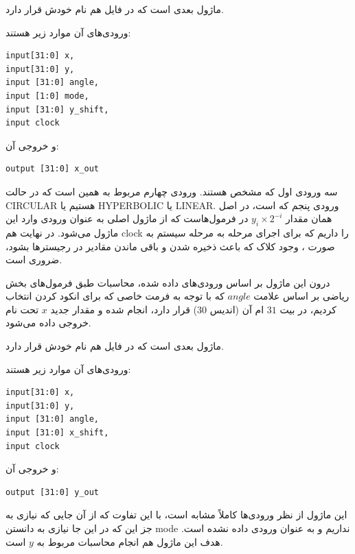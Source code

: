 \documentclass[12pt,titlepage,a4page , tikz , multi,table , svgnames,xcdraw]{article}
\begin{document}
\hrulefill

ماژول بعدی  است که در فایل هم نام خودش قرار دارد.

 
 ورودی‌های آن موارد زیر هستند:

\begin{latin}
\begin{verbatim}
input[31:0] x,
input[31:0] y,
input [31:0] angle,
input [1:0] mode,
input [31:0] y_shift,
input clock
\end{verbatim}
\end{latin}

و خروجی آن:

\begin{latin}
\begin{verbatim}
output [31:0] x_out
\end{verbatim}
\end{latin}

سه ورودی اول که مشخص هستند. ورودی چهارم مربوط به همین است که در حالت CIRCULAR هستیم یا HYPERBOLIC یا LINEAR. ورودی پنجم که  است، در اصل همان مقدار $y_i \times 2^{-i}$ در فرمول‌هاست که از ماژول اصلی به عنوان ورودی وارد این ماژول می‌شود. در نهایت هم clock را داریم که برای اجرای مرحله به مرحله سیستم به صورت ، وجود کلاک که باعث ذخیره شدن و باقی ماندن مقادیر در رجیسترها بشود، ضروری است.

درون این ماژول بر اساس ورودی‌های داده شده، محاسبات طبق فرمول‌های بخش ریاضی بر اساس علامت $angle$ که با توجه به فرمت خاصی که برای انکود کردن انتخاب کردیم، در بیت $31$ ام آن (اندیس $30$) قرار دارد، انجام شده و مقدار جدید $x$ تحت نام  خروجی داده می‌شود.

\hrulefill
 

ماژول بعدی  است که در فایل هم نام خودش قرار دارد.

 
 ورودی‌های آن موارد زیر هستند:

\begin{latin}
\begin{verbatim}
input[31:0] x,
input[31:0] y,
input [31:0] angle,
input [31:0] x_shift,
input clock
\end{verbatim}
\end{latin}

و خروجی آن:

\begin{latin}
\begin{verbatim}
output [31:0] y_out
\end{verbatim}
\end{latin}

این ماژول از نظر ورودی‌ها کاملاً مشابه  است، با این تفاوت که از آن جایی که نیازی به جز این که در این جا نیازی به دانستن mode نداریم و به عنوان ورودی داده نشده است. هدف این ماژول هم انجام محاسبات مربوط به $y$ است.
\end{document}
